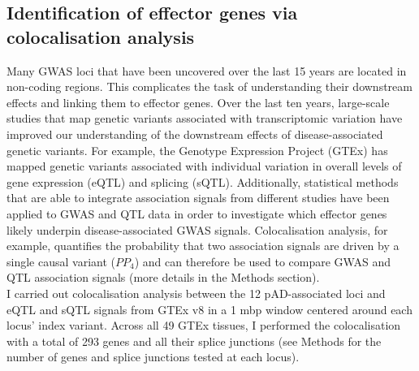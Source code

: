 \subsection{Identification of effector genes via colocalisation analysis} \label{sec:coloc}
Many GWAS loci that have been uncovered over the last 15 years are located in non-coding regions. This complicates the task of understanding their downstream effects and linking them to effector genes. Over the last ten years, large-scale studies that map genetic variants associated with transcriptomic variation have improved our understanding of the downstream effects of disease-associated genetic variants. For example, the Genotype Expression Project (GTEx) has mapped genetic variants associated with individual variation in overall levels of gene expression (eQTL) and splicing (sQTL). Additionally, statistical methods that are able to integrate association signals from different studies have been applied to GWAS and QTL data in order to investigate which effector genes likely underpin disease-associated GWAS signals. Colocalisation analysis, for example, quantifies the probability that two association signals are driven by a single causal variant ($PP_{4}$) and can therefore be used to compare GWAS and QTL association signals (more details in the Methods section).\\

I carried out colocalisation analysis between the 12 pAD-associated loci and eQTL and sQTL signals from GTEx v8 in a 1 mbp window centered around each locus' index variant. Across all 49 GTEx tissues, I performed the colocalisation with a total of 293 genes and all their splice junctions (see Methods for the number of genes and splice junctions tested at each locus).\\

